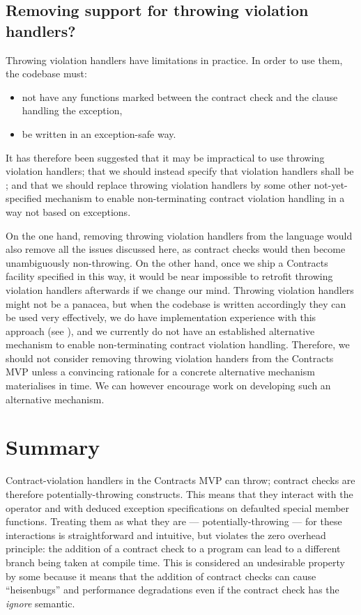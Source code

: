 \subsection{Removing support for throwing violation handlers?}

Throwing violation handlers have limitations in practice. In order to use them, the codebase must:
\begin{itemize}
\item not have any functions marked  between the contract check and the  clause handling the exception,
\item be written in an exception-safe way.
\end{itemize}
It has therefore been suggested that it may be impractical to use throwing violation handlers; that we should instead specify that violation handlers shall be ; and that we should replace throwing violation handlers by some other not-yet-specified mechanism to enable non-terminating contract violation handling in a way not based on exceptions.

On the one hand, removing throwing violation handlers from the language would also remove all the issues discussed here, as contract checks would then become unambiguously non-throwing. On the other hand, once we ship a Contracts facility specified in this way, it would be near impossible to retrofit throwing violation handlers afterwards if we change our mind. Throwing violation handlers might not be a panacea, but when the codebase is written accordingly they can be used very effectively, we do have implementation experience with this approach (see \cite{P2698R0}), and we currently do not have an established alternative mechanism to enable non-terminating contract violation handling. Therefore, we should not consider removing throwing violation handers from the Contracts MVP unless a convincing rationale for a concrete alternative mechanism materialises in time. We can however encourage work on developing such an alternative mechanism.

\section{Summary}

Contract-violation handlers in the Contracts MVP can throw; contract checks are therefore potentially-throwing constructs. This means that they interact with the  operator and with deduced exception specifications on defaulted special member functions. Treating them as what they are --- potentially-throwing --- for these interactions is straightforward and intuitive, but violates the zero overhead principle: the addition of a contract check to a program can lead to a different branch being taken at compile time. This is considered an undesirable property by some because it means that the addition of contract checks can cause ``heisenbugs'' and performance degradations even if the contract check has the \emph{ignore} semantic.

